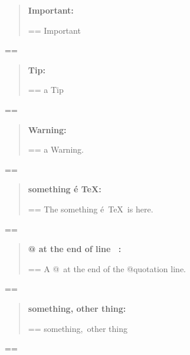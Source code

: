 \documentclass{book}
\makeatletter
\newenvironment{Texinfopreformatted}{%
  \par\GNUTobeylines\obeyspaces\frenchspacing\parskip=\z@\parindent=\z@}{}
{\catcode`\^^M=13 \gdef\GNUTobeylines{\catcode`\^^M=13 \def^^M{\null\par}}}
\newenvironment{Texinfoindented}{\begin{list}{}{}\item\relax}{\end{list}}
\renewcommand{\_}{\Texinfounderscore\discretionary{}{}{}}
\makeatother
\begin{document}
\begin{Texinfoindented}
\begin{quote}
\textbf{Important:} \begin{Texinfopreformatted}%
\ttfamily Important
\end{Texinfopreformatted}
\end{quote}
\begin{Texinfopreformatted}%
\ttfamily 
\end{Texinfopreformatted}
\begin{quote}
\textbf{Tip:} \begin{Texinfopreformatted}%
\ttfamily a Tip
\end{Texinfopreformatted}
\end{quote}
\begin{Texinfopreformatted}%
\ttfamily 
\end{Texinfopreformatted}
\begin{quote}
\textbf{Warning:} \begin{Texinfopreformatted}%
\ttfamily a Warning.
\end{Texinfopreformatted}
\end{quote}
\begin{Texinfopreformatted}%
\ttfamily 
\end{Texinfopreformatted}
\begin{quote}
\textbf{something \'{e} \TeX{}:} \begin{Texinfopreformatted}%
\ttfamily The something \'{e}\ \TeX{}\ is here.
\end{Texinfopreformatted}
\end{quote}
\begin{Texinfopreformatted}%
\ttfamily 
\end{Texinfopreformatted}
\begin{quote}
\textbf{@ at the end of line \ {}:} \begin{Texinfopreformatted}%
\ttfamily A @\ at the end of the @quotation line.
\end{Texinfopreformatted}
\end{quote}
\begin{Texinfopreformatted}%
\ttfamily 
\end{Texinfopreformatted}
\begin{quote}
\textbf{something, other thing:} \begin{Texinfopreformatted}%
\ttfamily something,\ other thing
\end{Texinfopreformatted}
\end{quote}
\begin{Texinfopreformatted}%
\ttfamily 
\end{Texinfopreformatted}

\end{Texinfoindented}
\end{document}
